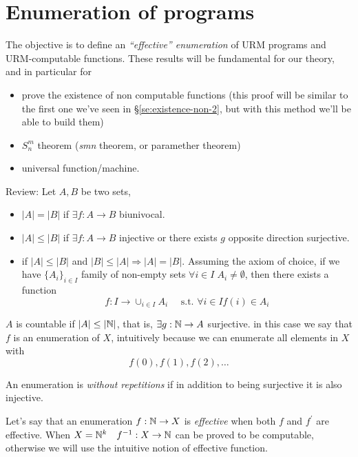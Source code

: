 \chapter{Enumeration of programs}
\newcommand{\pr}{\mathcal{PR}}
The objective is to define an \emph{``effective'' enumeration} of URM
programs and URM-computable functions. These results will be
fundamental for our theory, and in particular for
\begin{itemize}
\item prove the existence of non computable functions (this proof will
  be similar to the first one we've seen in
  \S\ref{se:existence-non-2}, but with this method we'll be able to
  build them)
\item $S^m_n$ theorem (\textit{smn} theorem, or paramether theorem)
  \item universal function/machine.
\end{itemize}

Review: Let $ A, B $ be two sets,
\begin{itemize}
\item $ |A| = |B| $ if $ \exists f:A\rightarrow B $ biunivocal.

\item $ |A| \leq |B| $ if $ \exists f:A\rightarrow B $ injective or
  there exists $g$ opposite direction surjective.

\item if $|A| \leq |B|$ and $|B| \leq |A| \Rightarrow |A|=|B|$.
  Assuming the axiom of choice, if we have $\{A_i\}_{i \in I}$ family
  of non-empty sets $\forall i \in I \; A_i \neq \emptyset$, then
  there exists a function $$f:I \rightarrow \cup_{i \in I}A_i \quad
  \text{ s.t. }  \forall i \in I f(i) \in A_i$$
\end{itemize}

$A$ is countable if $ |A| \leq |\mathbb{N}| $, that is,
$ \exists g: \mathbb{N} \rightarrow A $ surjective. in this case we say that
$f$ is an enumeration of $X$, intuitively because we can enumerate all
elements in $X$ with \[f(0), f(1), f(2), \dots \]

An enumeration is \emph{without repetitions} if in addition to being
surjective it is also injective.

Let's say that an enumeration $f: \mathbb{N} \rightarrow X$ is
\emph{effective} when both $f$ and $f^\prime$ are effective. When
$X = \mathbb{N}^k \quad f^{-1}: X \rightarrow \mathbb{N}$ can be proved to be
computable, otherwise we will use the intuitive notion of effective
function.



